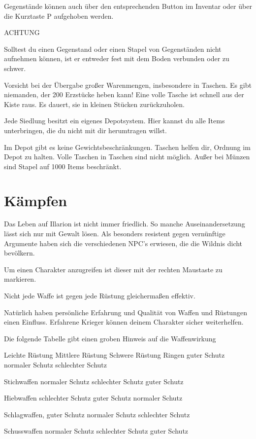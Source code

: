 \documentclass[a4paper,11pt]{book}
\begin{document}
Gegenstände können auch über den entsprechenden Button im Inventar oder über die Kurztaste P aufgehoben werden.

ACHTUNG

Solltest du einen Gegenstand oder einen Stapel von Gegenständen nicht aufnehmen können, ist er entweder fest mit dem Boden verbunden oder zu  schwer.

Vorsicht bei der Übergabe großer Warenmengen, insbesondere in Taschen. Es gibt niemanden, der 200 Erzstücke heben kann! Eine volle Tasche ist schnell aus der Kiste raus. Es dauert, sie in kleinen Stücken zurückzuholen.

Jede Siedlung besitzt ein eigenes Depotsystem. Hier kannst du alle Items unterbringen, die du nicht mit dir herumtragen willst.

Im Depot gibt es keine Gewichtsbeschränkungen. Taschen helfen dir, Ordnung im Depot zu halten. Volle Taschen in Taschen sind nicht möglich. Außer bei Münzen sind Stapel auf 1000 Items beschränkt.

\section{Kämpfen}

Das Leben auf Illarion ist nicht immer friedlich. So manche Auseinandersetzung lässt sich nur mit Gewalt lösen. Als besonders resistent gegen vernünftige Argumente haben sich die verschiedenen NPC’s erwiesen, die die Wildnis dicht bevölkern.

Um einen Charakter anzugreifen ist dieser mit der rechten Maustaste zu markieren.

Nicht jede Waffe ist gegen jede Rüstung gleichermaßen effektiv.

Natürlich haben persönliche Erfahrung und Qualität von Waffen und Rüstungen einen Einfluss. Erfahrene Krieger können deinem Charakter sicher weiterhelfen.

Die folgende Tabelle gibt einen groben Hinweis auf die Waffenwirkung

 Leichte Rüstung  Mittlere Rüstung  Schwere Rüstung Ringen  guter Schutz  normaler Schutz  schlechter Schutz

Stichwaffen  normaler Schutz  schlechter Schutz  guter Schutz

Hiebwaffen  schlechter Schutz  guter Schutz  normaler Schutz

Schlagwaffen,  guter Schutz  normaler Schutz  schlechter Schutz

Schusswaffen  normaler Schutz  schlechter Schutz  guter Schutz
\end{document}
